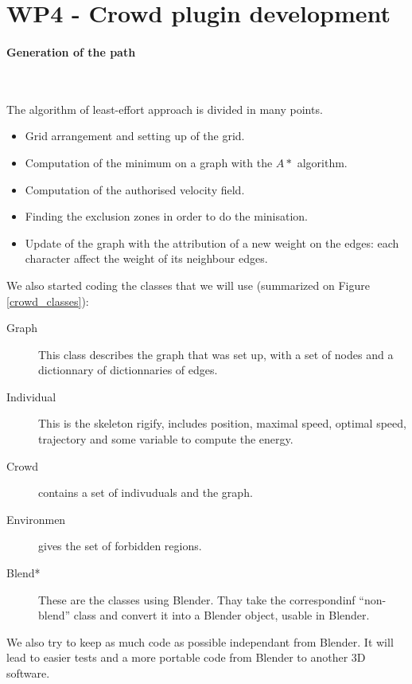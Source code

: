 \section{WP4 - Crowd plugin development}

\paragraph{Generation of the path}~

\noindent The algorithm of least-effort approach is divided in many points.
\begin{itemize}
  \item Grid arrangement and setting up of the grid.
  \item Computation of the minimum on a graph with the $A*$ algorithm.
  \item Computation of the authorised velocity field.
  \item Finding the exclusion zones in order to do the minisation.
  \item Update of the graph with the attribution of a new weight on the edges: each character affect the weight of its neighbour edges.
\end{itemize}

\noindent We also started coding the classes that we will use (summarized on Figure \ref{crowd_classes}):
\begin{description}
  \item[Graph] This class describes the graph that was set up, with a set of nodes and a dictionnary of dictionnaries of edges.
  \item[Individual] This is the skeleton rigify, includes position, maximal speed, optimal speed, trajectory and some variable to compute the energy.
  \item [Crowd] contains a set of indivuduals and the graph.
  \item[Environmen] gives the set of forbidden regions.
  \item[Blend*] These are the classes using Blender. Thay take the correspondinf ``non-blend'' class and convert it into a Blender object, usable in Blender. 
\end{description}

We also try to keep as much code as possible independant from Blender. It will lead to easier tests and a more portable code from Blender to another 3D software.

